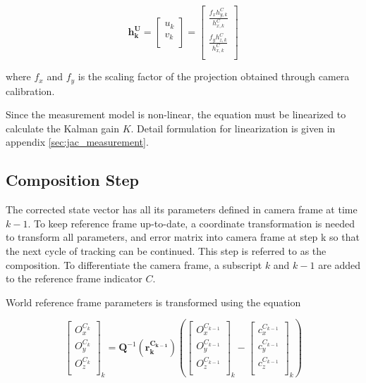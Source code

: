 \begin{equation}
\mathbf{h_{k}^{U}}= \begin{bmatrix}
u_{k} \\
v_{k} \\
\end{bmatrix}=\begin{bmatrix}
\frac{f_{x}h_{y,k}^{C}}{h_{x,k}^{C}} \\
\frac{f_{y}h_{z,k}^{C}}{h_{x,k}^{C}} \\
\end{bmatrix}
\end{equation}

\noindent where $f_{x}$ and $f_{y}$ is the scaling factor of the projection 
obtained through camera calibration.

Since the measurement model is non-linear, the equation must be
linearized to calculate the Kalman gain $K$. Detail formulation for
linearization is given in appendix \ref{sec:jac_measurement}.

\subsection{Composition Step}

The corrected state vector has all its parameters defined in camera
frame at time $k-1$. To keep reference frame up-to-date, a coordinate
transformation is needed to transform all parameters, and error matrix
into camera frame at step k so that the next cycle of tracking can be
continued. This step is referred to as the composition. To
differentiate the camera frame, a subscript $k$ and $k-1$ are added to
the reference frame indicator $C$.

World reference frame parameters is transformed using the equation

\begin{equation}
\begin{bmatrix}
O_{x}^{C_{k}} \\
O_{y}^{C_k} \\
O_{z}^{C_k} \\
\end{bmatrix}_{k}=\mathbf{Q}^{-1}(\mathbf{r_{k}^{C_{k-1}}})\left(
\begin{bmatrix}
O_{x}^{C_{k-1}} \\
O_{y}^{C_{k-1}} \\
O_{z}^{C_{k-1}} \\
\end{bmatrix}_{k}- \begin{bmatrix}
c_{x}^{C_{k-1}} \\
c_{y}^{C_{k-1}} \\
c_{z}^{C_{k-1}} \\
\end{bmatrix}_{k}\right)
\end{equation}

